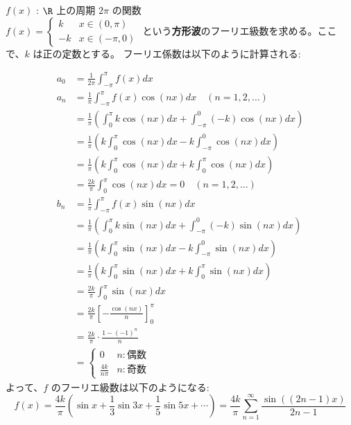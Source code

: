 \documentclass[article,paper=a4paper]{jlreq}
\begin{document}
\begin{ex}
    \quad $f(x)$ : $\R$ 上の周期 $2\pi$ の関数\\
    $f(x) = \begin{cases} k & x \in (0, \pi) \\ -k & x \in (-\pi, 0) \end{cases}$ という\textbf{方形波}のフーリエ級数を求める。ここで、$k$ は正の定数とする。
    フーリエ係数は以下のように計算される:

\begin{align*}
    a_0 &= \frac{1}{2\pi} \int_{-\pi}^{\pi} f(x) dx \\
    a_n &= \frac{1}{\pi} \int_{-\pi}^{\pi} f(x) \cos (nx) dx \quad (n = 1, 2, \ldots) \\
        &= \frac{1}{\pi} \left( \int_{0}^{\pi} k \cos (nx) dx + \int_{-\pi}^{0} (-k) \cos (nx) dx \right) \\
        &= \frac{1}{\pi} \left( k \int_{0}^{\pi} \cos (nx) dx - k \int_{-\pi}^{0} \cos (nx) dx \right) \\
        &= \frac{1}{\pi} \left( k \int_{0}^{\pi} \cos (nx) dx + k \int_{0}^{\pi} \cos (nx) dx \right) \\
        &= \frac{2k}{\pi} \int_{0}^{\pi} \cos (nx) dx = 0 \quad (n = 1, 2, \ldots) \\
    b_n &= \frac{1}{\pi} \int_{-\pi}^{\pi} f(x) \sin (nx) dx\\
        &= \frac{1}{\pi} \left( \int_{0}^{\pi} k \sin (nx) dx + \int_{-\pi}^{0} (-k) \sin (nx) dx \right) \\
        &= \frac{1}{\pi} \left( k \int_{0}^{\pi} \sin (nx) dx - k \int_{-\pi}^{0} \sin (nx) dx \right) \\
        &= \frac{1}{\pi} \left( k \int_{0}^{\pi} \sin (nx) dx + k \int_{0}^{\pi} \sin (nx) dx \right) \\
        &= \frac{2k}{\pi} \int_{0}^{\pi} \sin (nx) dx \\
        &= \frac{2k}{\pi} \left[ -\frac{\cos (nx)}{n} \right]_{0}^{\pi} \\
        &= \frac{2k}{\pi} \cdot \frac{1 - (-1)^n}{n} \\
        &=
        \begin{cases}
            0 & n : 偶数 \\ 
            \frac{4k}{n\pi} & n : 奇数
        \end{cases}
\end{align*}
    よって、$f$ のフーリエ級数は以下のようになる:
\begin{equation*}
    f(x) = \frac{4k}{\pi} \left( \sin x + \frac{1}{3} \sin 3x + \frac{1}{5} \sin 5x + \cdots \right) = \frac{4k}{\pi} \sum_{n=1}^{\infty} \frac{\sin((2n-1)x)}{2n-1}
\end{equation*}
\end{ex}
\end{document}
